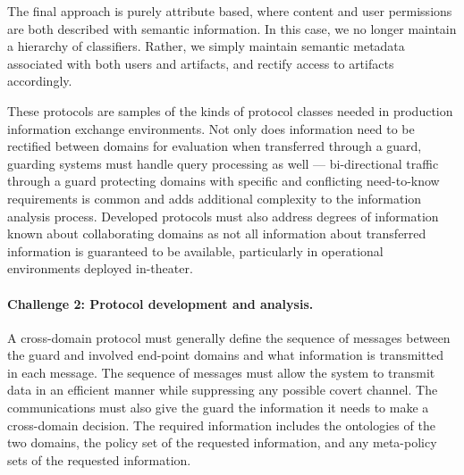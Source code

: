 \documentclass{sbir}
\begin{document}
The final approach is purely attribute based, where content and user permissions are both described with semantic information. In this case, we no longer maintain a hierarchy of classifiers. Rather, we simply maintain semantic metadata associated with both users and artifacts, and rectify access to artifacts accordingly.

These protocols are samples of the kinds of protocol classes needed in production information exchange environments. Not only does information need to be rectified between domains for evaluation when transferred through a guard, guarding systems must handle query processing as well --- bi-directional traffic through a guard protecting domains with specific and conflicting need-to-know requirements is common and adds additional complexity to the information analysis process. Developed protocols must also  address degrees of information known about collaborating domains as not all information about transferred information is guaranteed to be available, particularly in operational environments deployed in-theater.

\paragraph{Challenge 2: Protocol development and analysis.}
A cross-domain protocol must generally define the sequence of messages between the guard and involved end-point domains and what information is transmitted in each message. The sequence of messages must allow the system to transmit data in an efficient manner while suppressing any possible covert channel. 
The communications must also give the guard the information it needs to make a cross-domain decision. The required information includes the ontologies of the two domains, the policy set of the requested information, and any meta-policy sets of the requested information.

\end{document}
